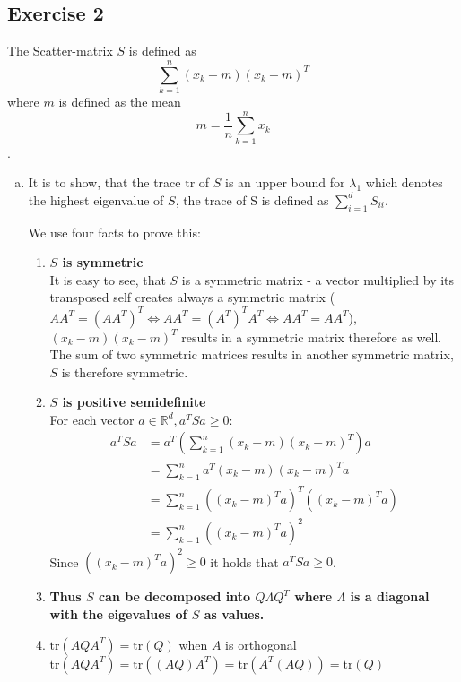 \documentclass[10pt,a4paper]{article}
\newcommand{\tr}{\text{tr}}
\begin{document}
\subsection*{Exercise 2}
The Scatter-matrix $S$ is defined as $$\sum_{k = 1}^{n} (x_k - m)(x_k - m)^T$$ where $m$ is defined as the mean $$m = \frac{1}{n}\sum_{k=1}^{n}x_k$$. 
\begin{enumerate}[(a)]
\item
It is to show, that the trace $\tr$ of $S$ is an upper bound for $\lambda_1$ which denotes the highest eigenvalue of $S$, the trace of S is defined as $\sum^d_{i=1} S_{ii}$.

We use four facts to prove this:
\begin{enumerate}[1.]
    \item \textbf{$S$ is symmetric} \\
    It is easy to see, that $S$ is a symmetric matrix - a vector multiplied by its transposed self creates always a symmetric matrix ($AA^T = (AA^T)^T \Leftrightarrow AA^T =  (A^T)^TA^T \Leftrightarrow AA^T =  AA^T$), $(x_k - m)(x_k - m)^T$ results in a symmetric matrix therefore as well. The sum of two symmetric matrices results in another symmetric matrix, $S$ is therefore symmetric.
    \item \textbf{$S$ is positive semidefinite}\\
    For each vector $a \in \mathbb{R}^d, a^TSa \ge 0$:\\
    \begin{align*}
        a^TSa &= a^T(\sum_{k = 1}^{n} (x_k - m)(x_k - m)^T)a\\
        &= \sum_{k = 1}^{n} a^T(x_k - m)(x_k - m)^Ta\\
        &= \sum_{k = 1}^{n} ((x_k - m)^Ta)^T((x_k - m)^Ta)\\
        &= \sum_{k = 1}^{n} ((x_k - m)^Ta)^2
    \end{align*}
    Since $((x_k - m)^Ta)^2 \ge 0$ it holds that $a^TSa \ge 0$.
    \item \textbf{Thus $S$ can be decomposed into $Q\Lambda Q^T$ where $\Lambda$ is a diagonal with the eigevalues of $S$ as values.} %
    \item $\tr(AQA^T) = \tr(Q)$ when $A$ is orthogonal \\
    $\tr(AQA^T) = \tr((AQ)A^T) = \tr(A^T(AQ)) = \tr(Q)$


\end{enumerate}
\end{enumerate}
\end{document}
